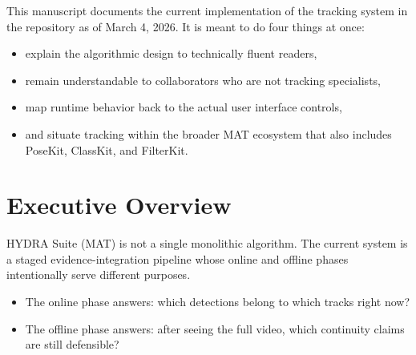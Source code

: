 \documentclass[11pt]{article}
\newcommand{\codepath}[1]{\path{#1}}
\begin{document}
\begin{titlepage}
\vspace{1.1cm}

\begin{minipage}{0.92\linewidth}
\color{Ink}
\large
This manuscript documents the current implementation of the tracking system in the repository as of March 4, 2026. It is meant to do four things at once:

\begin{itemize}
  \item explain the algorithmic design to technically fluent readers,
  \item remain understandable to collaborators who are not tracking specialists,
  \item map runtime behavior back to the actual user interface controls,
  \item and situate tracking within the broader MAT ecosystem that also includes PoseKit, ClassKit, and FilterKit.
\end{itemize}
\end{minipage}

\vfill


\end{titlepage}

\clearpage
{}
\tableofcontents
\clearpage

\section{Executive Overview}

HYDRA Suite (MAT) is not a single monolithic algorithm. The current system is a staged evidence-integration pipeline whose online and offline phases intentionally serve different purposes.

\begin{itemize}
  \item The online phase answers: which detections belong to which tracks right now?
  \item The offline phase answers: after seeing the full video, which continuity claims are still defensible?
\end{itemize}
\end{document}
